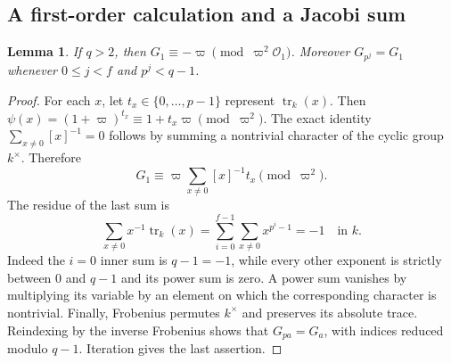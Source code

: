 \documentclass[11pt]{amsart}
\newtheorem{lemma}[theorem]{Lemma}
\theoremstyle{definition}
\theoremstyle{remark}
\newcommand{\OO}{\mathcal O}\newcommand{\pp}{\mathfrak p}\newcommand{\PP}{\mathfrak P}
\begin{document}
\subsection{A first-order calculation and a Jacobi sum}
\begin{lemma}\label{A:gauss-first}
If $q>2$, then $G_1\equiv-\varpi\pmod{\varpi^2\OO_1}$.
Moreover $G_{p^j}=G_1$ whenever $0\le j<f$ and $p^j<q-1$.
\end{lemma}
\begin{proof}
For each $x$, let $t_x\in\{0,\ldots,p-1\}$ represent
$\operatorname{tr}_k(x)$. Then
$\psi(x)=(1+\varpi)^{t_x}\equiv1+t_x\varpi\pmod{\varpi^2}$.
The exact identity $\sum_{x\ne0}[x]^{-1}=0$ follows by summing a
nontrivial character of the cyclic group $k^\times$. Therefore
\[
 G_1\equiv\varpi\sum_{x\ne0}[x]^{-1}t_x\pmod{\varpi^2}.
\]
The residue of the last sum is
\[
 \sum_{x\ne0}x^{-1}\operatorname{tr}_k(x)
   =\sum_{i=0}^{f-1}\sum_{x\ne0}x^{p^i-1}=-1\quad\text{in }k.
\]
Indeed the $i=0$ inner sum is $q-1=-1$, while every other exponent is
strictly between $0$ and $q-1$ and its power sum is zero. A power sum
vanishes by multiplying its variable by an element on which the
corresponding character is nontrivial. Finally, Frobenius permutes
$k^\times$ and preserves its absolute trace. Reindexing by the inverse
Frobenius shows that $G_{pa}=G_a$, with indices reduced modulo $q-1$.
Iteration gives the last assertion.
\end{proof}
\end{document}
